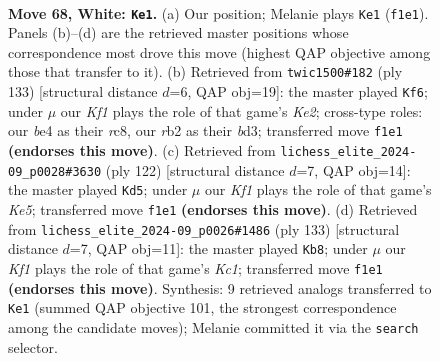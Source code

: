 \documentclass[11pt]{article}
\begin{document}
\clearpage

\begin{figure}[p]\centering
\begin{subfigure}{0.46\textwidth}\centering
\resizebox{\linewidth}{!}{%
\newchessgame
\chessboard[
  setfen={6R1/8/3k4/8/RP2b3/8/1r6/5K2 w - - 9 68},
  showmover=false,
  pgfstyle=straightmove, color=movearrow, markmove={f1-e1}
]}
\caption{}
\end{subfigure}\hfill
\begin{subfigure}{0.46\textwidth}\centering
\resizebox{\linewidth}{!}{%
\newchessgame
\chessboard[
  setfen={2R5/4k3/8/r4p2/8/3B1K2/8/8 b - - 21 67},
  showmover=false,
  pgfstyle=straightmove, color=movearrow, markmove={e7-f6}
]}
\caption{}
\end{subfigure}
\\[4pt]
\begin{subfigure}{0.46\textwidth}\centering
\resizebox{\linewidth}{!}{%
\newchessgame
\chessboard[
  setfen={8/8/r7/4K2k/8/P5R1/8/8 w - - 15 62},
  showmover=false,
  pgfstyle=straightmove, color=movearrow, markmove={e5-d5}
]}
\caption{}
\end{subfigure}\hfill
\begin{subfigure}{0.46\textwidth}\centering
\resizebox{\linewidth}{!}{%
\newchessgame
\chessboard[
  setfen={2k5/R7/p6r/2K5/8/8/8/8 b - - 10 67},
  showmover=false,
  pgfstyle=straightmove, color=movearrow, markmove={c8-b8}
]}
\caption{}
\end{subfigure}
\caption{\textbf{Move 68, White: \texttt{Ke1}.} (a) Our position; Melanie plays \texttt{Ke1} (\texttt{f1e1}). Panels (b)--(d) are the retrieved master positions whose correspondence most drove this move (highest QAP objective among those that transfer to it). (b) Retrieved from \texttt{twic1500\#182} (ply 133) [structural distance $d$=6, QAP obj=19]: the master played \texttt{Kf6}; under $\mu$ our \emph{Kf1} plays the role of that game's \emph{Ke2}; cross-type roles: our \emph{b}e4 as their \emph{r}c8, our \emph{r}b2 as their \emph{b}d3; transferred move \texttt{f1e1} \textbf{(endorses this move)}. (c) Retrieved from \texttt{lichess\_elite\_2024-09\_p0028\#3630} (ply 122) [structural distance $d$=7, QAP obj=14]: the master played \texttt{Kd5}; under $\mu$ our \emph{Kf1} plays the role of that game's \emph{Ke5}; transferred move \texttt{f1e1} \textbf{(endorses this move)}. (d) Retrieved from \texttt{lichess\_elite\_2024-09\_p0026\#1486} (ply 133) [structural distance $d$=7, QAP obj=11]: the master played \texttt{Kb8}; under $\mu$ our \emph{Kf1} plays the role of that game's \emph{Kc1}; transferred move \texttt{f1e1} \textbf{(endorses this move)}. Synthesis: 9 retrieved analogs transferred to \texttt{Ke1} (summed QAP objective 101, the strongest correspondence among the candidate moves); Melanie committed it via the \texttt{search} selector.}
\label{fig:thought-m134}
\end{figure}
\end{document}
